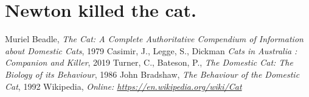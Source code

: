 \documentclass{article}
\begin{document}
\printnoidxglossary[style=listdotted]

\section*{Newton killed the cat.}

\begin{thebibliography}{8}
     Muriel Beadle, \emph{The Cat: A Complete Authoritative Compendium of Information about Domestic Cats}, 1979
     Casimir, J., Legge, S., Dickman \emph{Cats in Australia : Companion and Killer}, 2019
     Turner, C., Bateson, P., \emph{The Domestic Cat: The Biology of its Behaviour}, 1986
     John Bradshaw, \emph{The Behaviour of the Domestic Cat}, 1992
     Wikipedia, \emph{Online: \url{https://en.wikipedia.org/wiki/Cat}}
\end{thebibliography}


\fancyfoot[L]{}
\end{document}
